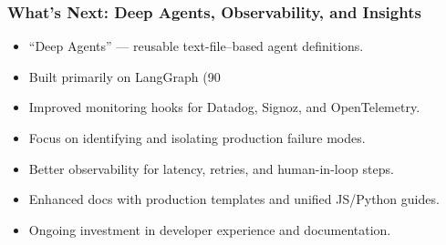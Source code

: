 \begin{frame}[fragile]\frametitle{What’s Next: Deep Agents, Observability, and Insights}
  \begin{itemize}
    \item “Deep Agents” — reusable text-file–based agent definitions.
    \item Built primarily on LangGraph (90%
    \item Improved monitoring hooks for Datadog, Signoz, and OpenTelemetry.
    \item Focus on identifying and isolating production failure modes.
    \item Better observability for latency, retries, and human-in-loop steps.
    \item Enhanced docs with production templates and unified JS/Python guides.
    \item Ongoing investment in developer experience and documentation.
  \end{itemize}
\end{frame}


